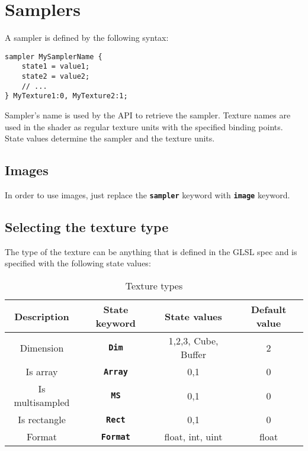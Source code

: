\documentclass[11pt,a4paper,final,titlepage]{article}
\begin{document}
\pagebreak
\section{Samplers}\label{sec:samplers}

A sampler is defined by the following syntax:
\begin{lstlisting}
sampler MySamplerName {
	state1 = value1;
	state2 = value2;
	// ...
} MyTexture1:0, MyTexture2:1;
\end{lstlisting}
Sampler's name is used by the API to retrieve the sampler. Texture names are used in the shader
as regular texture units with the specified binding points.
State values determine the sampler and the texture units.

\subsection{Images}
In order to use images, just replace the \texttt{\textbf{sampler}} keyword with \texttt{\textbf{image}}
keyword.

\subsection{Selecting the texture type}
The type of the texture can be anything that is defined in the GLSL spec and is specified with
the following state values:
\begin{table}[h]
\centering
\begin{tabular}{|c|c|c|c|}
\hline
Description & State keyword & State values & Default value\\
\hline\hline
Dimension & \texttt{\textbf{Dim}} & 1,2,3, Cube, Buffer & 2\\
\hline
Is array & \texttt{\textbf{Array}} & 0,1 & 0\\
\hline
Is multisampled & \texttt{\textbf{MS}} & 0,1 & 0\\
\hline
Is rectangle & \texttt{\textbf{Rect}} & 0,1 & 0\\
\hline
Format & \texttt{\textbf{Format}} & float, int, uint & float\\
\hline
\end{tabular}
\caption{Texture types}
\label{tab:texTypes}
\end{table}
\end{document}
